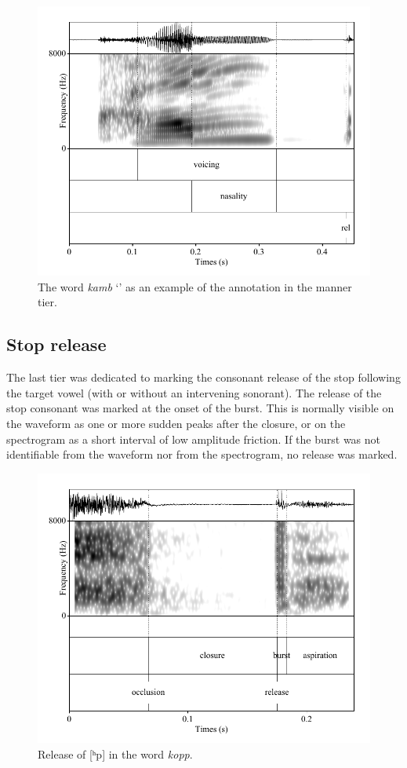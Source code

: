 \documentclass[11pt,a4paper,openany]{memoir}\usepackage[]{graphicx}\usepackage[]{color}
\begin{document}
\begin{figure}
\centering
\includegraphics[width=\textwidth]{kamb}
\caption{The word \textit{kamb} `' as an example of the annotation in the manner tier.}
\label{f:mann}
\end{figure}

\subsection{Stop release}
The last tier was dedicated to marking the consonant release of the stop following the target vowel (with or without an intervening sonorant).
The release of the stop consonant was marked at the onset of the burst.
This is normally visible on the waveform as one or more sudden peaks after the closure, or on the spectrogram as a short interval of low amplitude friction.
If the burst was not identifiable from the waveform nor from the spectrogram, no release was marked.

\begin{figure}
\centering
\includegraphics[width=\textwidth]{kopp}
\caption{Release of [ʰp] in the word \textit{kopp}.}
\label{f:release}
\end{figure}
\end{document}
